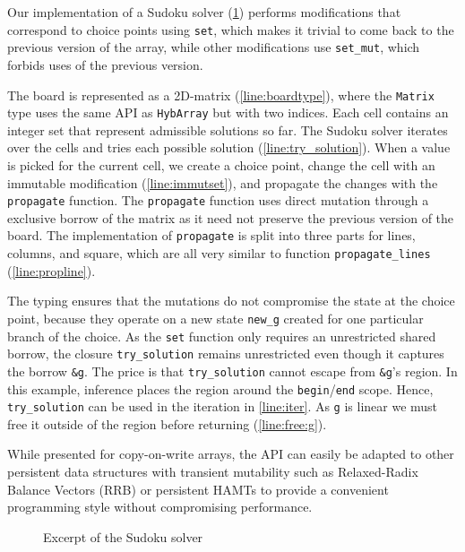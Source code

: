 Our implementation of a Sudoku solver (\cref{ex:sudoku}) performs
modifications that correspond to choice points using \lstinline/set/,
which makes it trivial to come back to the previous version
of the array, while other modifications use \lstinline/set_mut/, which
forbids uses of the previous version.

The board is represented as a 2D-matrix (\cref{line:boardtype}), where
the \lstinline/Matrix/ type uses the same API as \lstinline/HybArray/
but with two indices.
Each cell contains an integer set that represent admissible solutions so far.
The Sudoku solver iterates over the cells and tries each possible solution (\cref{line:try_solution}).
When a value is picked for the current cell, we create a choice point,
change the cell with an immutable modification (\cref{line:immutset}), and propagate
the changes with the \lstinline/propagate/ function.
The \lstinline/propagate/ function uses direct mutation through a
exclusive borrow of the matrix as it need not preserve the previous
version of the board.
The implementation of \lstinline/propagate/ is split into three parts
for lines, columns, and square, which are all very similar to function
\lstinline/propagate_lines/ (\cref{line:propline}).

The typing ensures that the mutations do not compromise the state at
the choice point, because they operate on a new state \lstinline/new_g/ created for one
particular branch of the choice.
As the \lstinline/set/ function only requires an unrestricted shared borrow,
the closure \lstinline/try_solution/ remains unrestricted even though
it captures the borrow \lstinline/&g/. 
The price is that \lstinline/try_solution/ cannot escape from
\lstinline/&g/'s region. In this example, inference places the region
around the \lstinline/begin//\lstinline/end/ scope.
Hence, \lstinline/try_solution/ can be used in
the iteration in \cref{line:iter}.
As \lstinline/g/ is linear we must free it outside of the region
before returning (\cref{line:free:g}). 

While presented for copy-on-write arrays, the API
can easily be adapted to other persistent data structures with
transient mutability such as Relaxed-Radix Balance Vectors (RRB) \cite{DBLP:journals/pacmpl/Puente17}
or persistent HAMTs \cite{bagwell2001ideal,clojurehamt} to provide  a
convenient programming style without compromising performance.

\begin{figure}
  \centering
  
    \vspace{-15pt}
  \caption{Excerpt of the Sudoku solver}
  \label{ex:sudoku}
\end{figure}

